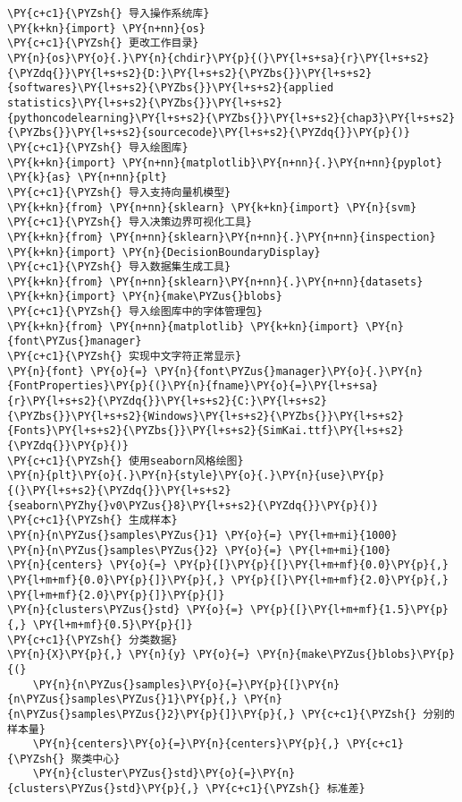 \begin{Verbatim}[commandchars=\\\{\}]
\PY{c+c1}{\PYZsh{} 导入操作系统库}
\PY{k+kn}{import} \PY{n+nn}{os}
\PY{c+c1}{\PYZsh{} 更改工作目录}
\PY{n}{os}\PY{o}{.}\PY{n}{chdir}\PY{p}{(}\PY{l+s+sa}{r}\PY{l+s+s2}{\PYZdq{}}\PY{l+s+s2}{D:}\PY{l+s+s2}{\PYZbs{}}\PY{l+s+s2}{softwares}\PY{l+s+s2}{\PYZbs{}}\PY{l+s+s2}{applied statistics}\PY{l+s+s2}{\PYZbs{}}\PY{l+s+s2}{pythoncodelearning}\PY{l+s+s2}{\PYZbs{}}\PY{l+s+s2}{chap3}\PY{l+s+s2}{\PYZbs{}}\PY{l+s+s2}{sourcecode}\PY{l+s+s2}{\PYZdq{}}\PY{p}{)}
\PY{c+c1}{\PYZsh{} 导入绘图库}
\PY{k+kn}{import} \PY{n+nn}{matplotlib}\PY{n+nn}{.}\PY{n+nn}{pyplot} \PY{k}{as} \PY{n+nn}{plt}
\PY{c+c1}{\PYZsh{} 导入支持向量机模型}
\PY{k+kn}{from} \PY{n+nn}{sklearn} \PY{k+kn}{import} \PY{n}{svm}
\PY{c+c1}{\PYZsh{} 导入决策边界可视化工具}
\PY{k+kn}{from} \PY{n+nn}{sklearn}\PY{n+nn}{.}\PY{n+nn}{inspection} \PY{k+kn}{import} \PY{n}{DecisionBoundaryDisplay}
\PY{c+c1}{\PYZsh{} 导入数据集生成工具}
\PY{k+kn}{from} \PY{n+nn}{sklearn}\PY{n+nn}{.}\PY{n+nn}{datasets} \PY{k+kn}{import} \PY{n}{make\PYZus{}blobs}
\PY{c+c1}{\PYZsh{} 导入绘图库中的字体管理包}
\PY{k+kn}{from} \PY{n+nn}{matplotlib} \PY{k+kn}{import} \PY{n}{font\PYZus{}manager}
\PY{c+c1}{\PYZsh{} 实现中文字符正常显示}
\PY{n}{font} \PY{o}{=} \PY{n}{font\PYZus{}manager}\PY{o}{.}\PY{n}{FontProperties}\PY{p}{(}\PY{n}{fname}\PY{o}{=}\PY{l+s+sa}{r}\PY{l+s+s2}{\PYZdq{}}\PY{l+s+s2}{C:}\PY{l+s+s2}{\PYZbs{}}\PY{l+s+s2}{Windows}\PY{l+s+s2}{\PYZbs{}}\PY{l+s+s2}{Fonts}\PY{l+s+s2}{\PYZbs{}}\PY{l+s+s2}{SimKai.ttf}\PY{l+s+s2}{\PYZdq{}}\PY{p}{)}
\PY{c+c1}{\PYZsh{} 使用seaborn风格绘图}
\PY{n}{plt}\PY{o}{.}\PY{n}{style}\PY{o}{.}\PY{n}{use}\PY{p}{(}\PY{l+s+s2}{\PYZdq{}}\PY{l+s+s2}{seaborn\PYZhy{}v0\PYZus{}8}\PY{l+s+s2}{\PYZdq{}}\PY{p}{)}
\PY{c+c1}{\PYZsh{} 生成样本}
\PY{n}{n\PYZus{}samples\PYZus{}1} \PY{o}{=} \PY{l+m+mi}{1000}
\PY{n}{n\PYZus{}samples\PYZus{}2} \PY{o}{=} \PY{l+m+mi}{100}
\PY{n}{centers} \PY{o}{=} \PY{p}{[}\PY{p}{[}\PY{l+m+mf}{0.0}\PY{p}{,} \PY{l+m+mf}{0.0}\PY{p}{]}\PY{p}{,} \PY{p}{[}\PY{l+m+mf}{2.0}\PY{p}{,} \PY{l+m+mf}{2.0}\PY{p}{]}\PY{p}{]}
\PY{n}{clusters\PYZus{}std} \PY{o}{=} \PY{p}{[}\PY{l+m+mf}{1.5}\PY{p}{,} \PY{l+m+mf}{0.5}\PY{p}{]}
\PY{c+c1}{\PYZsh{} 分类数据}
\PY{n}{X}\PY{p}{,} \PY{n}{y} \PY{o}{=} \PY{n}{make\PYZus{}blobs}\PY{p}{(}
    \PY{n}{n\PYZus{}samples}\PY{o}{=}\PY{p}{[}\PY{n}{n\PYZus{}samples\PYZus{}1}\PY{p}{,} \PY{n}{n\PYZus{}samples\PYZus{}2}\PY{p}{]}\PY{p}{,} \PY{c+c1}{\PYZsh{} 分别的样本量}
    \PY{n}{centers}\PY{o}{=}\PY{n}{centers}\PY{p}{,} \PY{c+c1}{\PYZsh{} 聚类中心}
    \PY{n}{cluster\PYZus{}std}\PY{o}{=}\PY{n}{clusters\PYZus{}std}\PY{p}{,} \PY{c+c1}{\PYZsh{} 标准差}

\end{Verbatim}
